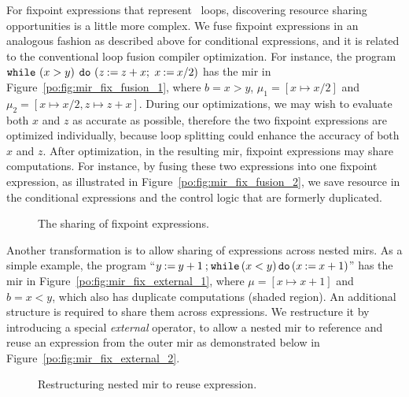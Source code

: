 For fixpoint expressions that represent \whilelit~loops, discovering
resource sharing opportunities is a little more complex.  We fuse
fixpoint expressions in an analogous fashion as described above for
conditional expressions, and it is related to the conventional loop fusion
compiler optimization.  For instance, the program $\texttt{while}~(x > y)$
$\texttt{do}~(z\mathbin{:=}{z + x} \mathbin{;}$ $x\mathbin{:=}{x / 2})$ has the
\gls{mir} in Figure~\ref{po:fig:mir_fix_fusion_1}, where $b = x > y$, $\mu_1 =
[x \mapsto x / 2]$ and $\mu_2 = [x \mapsto x / 2, z \mapsto z + x]$.  During
our optimizations, we may wish to evaluate both $x$ and $z$ as accurate as
possible, therefore the two fixpoint expressions are optimized individually,
because loop splitting could enhance the accuracy of both $x$ and $z$.  After
optimization, in the resulting \gls{mir}, fixpoint expressions may share
computations.  For instance, by fusing these two expressions into one fixpoint
expression, as illustrated in Figure~\ref{po:fig:mir_fix_fusion_2}, we save
resource in the conditional expressions and the control logic that are formerly
duplicated.
\begin{figure}[ht]
    \centering
    \caption{The sharing of fixpoint expressions.}
\end{figure}

Another transformation is to allow sharing of expressions across nested
\glspl{mir}.  As a simple example, the program ``$y\mathbin{:=}{y + 1}
\mathbin{;} \texttt{while}\left(x < y\right)\texttt{do}\left(x\mathbin{:=}{x + 1}\right)$'' has the \gls{mir} in
Figure~\ref{po:fig:mir_fix_external_1}, where $\mu = [x \mapsto x + 1]$ and $b
= x < y$, which also has duplicate computations (shaded region).  An additional
structure is required to share them across expressions.  We restructure it by
introducing a special \emph{external} operator, to allow a nested \gls{mir}
to reference and reuse an expression from the outer \gls{mir} as demonstrated
below in Figure~\ref{po:fig:mir_fix_external_2}.
\begin{figure}[ht]
    \centering
    \caption{Restructuring nested \gls{mir} to reuse expression.}
    \centering
\end{figure}

